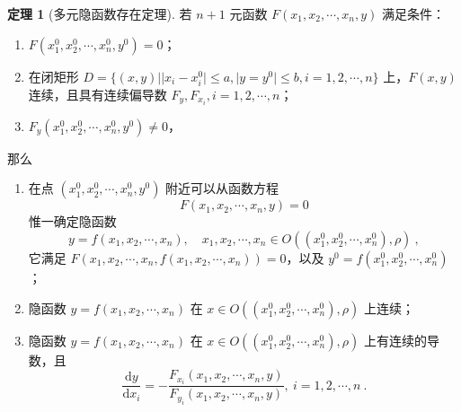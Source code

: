 \documentclass[zihao=-4,linespread=1.8,UTF8,nothm]{aytony_base}
\theoremstyle{definition}
\newtheorem{theorem}{\indent\heiti\textbf{定理}}[subsection]
\begin{document}
\begin{theorem}[多元隐函数存在定理]
    若 $n+1$ 元函数 $F(x_1, x_2, \cdots, x_n, y)$ 满足条件：

    \begin{enumerate}[nosep]
        \item $F(x_1^0, x_2^0, \cdots, x_n^0, y^0) = 0$；
        \item 在闭矩形 $D = \{(x, y)||x_i - x_i^0| \leqslant a, |y = y^0| \leqslant b, i = 1, 2, \cdots, n\}$ 上，$F(x, y)$ 连续，且具有连续偏导数 $F_y, F_{x_i}, i = 1, 2, \cdots, n$；
        \item $F_y(x_1^0, x_2^0, \cdots, x_n^0, y^0) \neq 0$，
    \end{enumerate}

    那么

    \begin{enumerate}[nosep]
        \item 在点 $(x_1^0, x_2^0, \cdots, x_n^0, y^0)$ 附近可以从函数方程 $$
                  F(x_1, x_2, \cdots, x_n, y) = 0
              $$ 惟一确定隐函数 $$
                  y = f(x_1, x_2, \cdots, x_n), \quad x_1, x_2, \cdots, x_n \in O((x_1^0, x_2^0, \cdots, x_n^0), \rho)\ ,
              $$ 它满足 $F(x_1, x_2, \cdots, x_n, f(x_1, x_2, \cdots, x_n)) = 0$，以及 $y^0 = f(x_1^0, x_2^0, \cdots, x_n^0)$；
        \item 隐函数 $y = f(x_1, x_2, \cdots, x_n)$ 在 $x \in O((x_1^0, x_2^0, \cdots, x_n^0), \rho)$ 上连续；
        \item 隐函数 $y = f(x_1, x_2, \cdots, x_n)$ 在 $x \in O((x_1^0, x_2^0, \cdots, x_n^0), \rho)$ 上有连续的导数，且 $$
                  \dfrac{\mathrm{d}y}{\mathrm{d}x_i} = -\dfrac{F_{x_i}(x_1, x_2, \cdots, x_n, y)}{F_{y_i}(x_1, x_2, \cdots, x_n, y)},\ i = 1, 2, \cdots, n\ .
              $$
    \end{enumerate}
\end{theorem}
\end{document}
